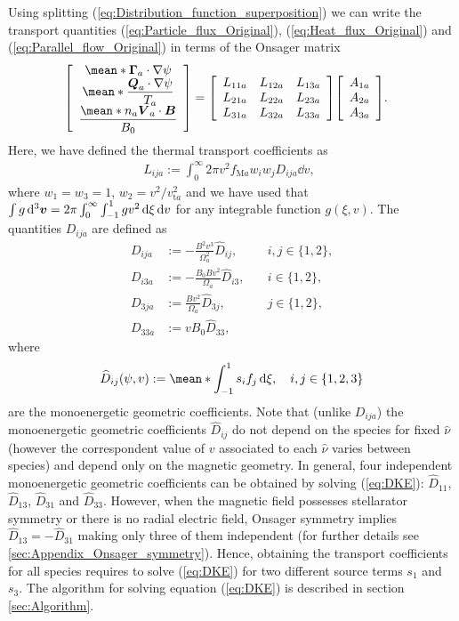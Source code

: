 Using splitting (\ref{eq:Distribution_function_superposition}) we can write the transport quantities (\ref{eq:Particle_flux_Original}), (\ref{eq:Heat_flux_Original}) and (\ref{eq:Parallel_flow_Original}) in terms of the Onsager matrix
%
\begin{align}
	&\Matrix{c}
	{
		\mean*{\vb*{\Gamma}_a \cdot \nabla \psi} \\
		\mean*{ \dfrac{\vb*{Q}_a \cdot \nabla \psi}{T_a} }     \\ 
		\dfrac{\mean*{n_a \vb*{V}_{a} \cdot\vb*{B}}}{B_0}
	}
	=
	\Matrix{ccc}
	{
		L_{11a} & L_{12a}  & L_{13a} \\
		L_{21a} & L_{22a}  & L_{23a} \\
		L_{31a} & L_{32a}  & L_{33a} 
	}
	\Matrix{c}
	{ 
		A_{1a} \\
		A_{2a} \\
		A_{3a} 
	}.
\end{align}
Here, we have defined the thermal transport coefficients as 
%
\begin{align}
	L_{ija} :=    
	\int_{0}^{\infty}
	2\pi v^2
	f_{\text{M}a} 
	w_i w_j 
	D_{ija} 
	\dd{v}, \ \ %
\end{align}
where $w_1=w_3=1$, $w_2=v^2/v_{\text{t}a}^2$ and we have used that $\int g\dd[3]{\vb*{v}} = 2\pi \int_{0}^{\infty}\int_{-1}^{1} g v^2 \dd{\xi}\dd{v}$ for any integrable function $g(\xi,v)$. The quantities $D_{ija}$ are defined as
%
\begin{align}
	D_{ija} & :=-\frac{B^2v^3}{\Omega_a^2} \widehat{D}_{ij}, &\quad i,j \in\{1,2\},
	\\
	D_{i3a} & :=  
	- \frac{B_0 B v^2}{\Omega_a} \widehat{D}_{i3}, &\quad i \in\{1,2\},
	\\
	D_{3ja} & := \frac{B v^2}{\Omega_a} \widehat{D}_{3j}, &\quad j \in\{1,2\},
	\\
	D_{33a} & := v B_0 \widehat{D}_{33}, &
\end{align}
where  
%
\begin{align}
	\widehat{D}_{ij}(\psi,v) := \mean*{ \int_{-1}^{1}  s_i f_j   \dd{\xi} }, \quad i,j\in\{1,2,3\}
	\label{eq:Monoenergetic_geometric_coefficients}
\end{align} 
are the monoenergetic geometric coefficients. Note that (unlike $D_{ija}$) the monoenergetic geometric coefficients $\widehat{D}_{ij}$ do not depend on the species for fixed $\hat{\nu}$ (however the correspondent value of $v$ associated to each $\hat{\nu}$ varies between species) and depend only on the magnetic geometry. In general, four independent monoenergetic geometric coefficients can be obtained by solving (\ref{eq:DKE}): $\widehat{D}_{11}$, $\widehat{D}_{13}$, $\widehat{D}_{31}$ and $\widehat{D}_{33}$. However, when the magnetic field possesses stellarator symmetry \cite{DEWAR1998275} or there is no radial electric field, Onsager symmetry implies $\widehat{D}_{13} = -\widehat{D}_{31}$ \cite{VanRij_1989} making only three of them independent (for further details see \ref{sec:Appendix_Onsager_symmetry}). Hence, obtaining the transport coefficients for all species requires to solve (\ref{eq:DKE}) for two different source terms $s_1$ and $s_3$. The algorithm for solving equation (\ref{eq:DKE}) is described in section \ref{sec:Algorithm}. 

